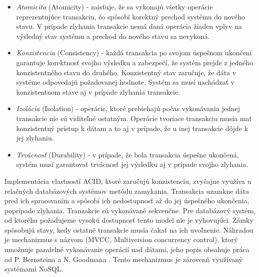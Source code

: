 \documentclass[11pt,twoside,a4paper]{book}
\begin{document}
\begin{itemize}
  \item \emph{Atomicita} (Atomicity) - zaisťuje, že sa vykonajú všetky operácie reprezentujúce transakciu, čo spôsobí korektný prechod systému do nového stavu. V prípade zlyhania transakcie nemá daná operácia žiaden vplyv na výsledný stav systému a prechod do nového stavu sa nevykoná.
  \item \emph{Konzistencia} (Consistency) - každá transakcia po svojom úspešnom ukončení garantuje korektnosť svojho výsledku a zabezpečí, že systém prejde z jedného konzistentného stavu do druhého. Konzistentný stav zaručuje, že dáta v systéme odpovedajú požadovanej hodnote. Systém sa musí nachádzať v konzistentnom stave aj v prípade zlyhania transakcie.
  \item \emph{Izolácia} (Isolation) - operácie, ktoré prebiehajú počas vykonávania jednej transakcie nie sú viditeľné ostatným. Operácie tvoriace transakciu musia mať konzistentný prístup k dátam a to aj v prípade, že u inej transakcie dôjde k jej zlyhaniu.
  \item \emph{Trvácnosť} (Durability) - v prípade, že bola transakcia úspešne ukončená, systém musí garantovať trvácnosť jej výsledku aj v prípade svojho zlyhania.
\end{itemize}
Implementácia vlastností ACID, ktoré zaručujú konzistenciu, zvyčajne využíva u relačných databázových systémov metódu zamykania. Transakcia uzamkne dáta pred ich spracovaním a spôsobí ich nedostupnosť až do jej úspešného ukončenia, poprípade zlyhania. Tranzakcie sú vykonávané sekvenčne. Pre databázový systém, od ktoréhu požadujeme vysokú dostupnosť tento model nie je vyhovujúci. Zámky spôsobujú stavy, kedy ostatné transakcie musia čakať na ich uvoľnenie. Náhradou je mechanizmus s názvom  (MVCC, Multiversion concurrency control), ktorý umožnuje paralelné vykonávanie operácií nad dátami, jeho popis obsahuje práca od P. Bernsteina a N. Goodmana \cite{bernstein1981concurrency}. Tento mechanizmus je zárovenň využívaný systémami NoSQL.
\end{document}
